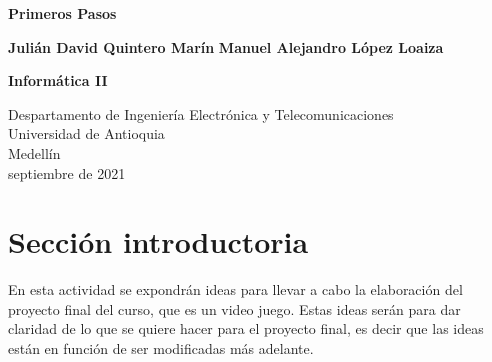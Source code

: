 \documentclass{article}
\begin{document}
\begin{titlepage}
    \begin{center}
        \vspace*{1cm}
            
        \Huge
        \textbf{Primeros Pasos}
            
        \vspace{0.5cm}
        \LARGE
        
            
        \vspace{1.5cm}
            
        \textbf{Julián David Quintero Marín}
		\textbf{Manuel Alejandro López Loaiza}
        \newline
        \newline
        \newline
        \newline

        
        
        \textbf{Informática II}
        
        \vfill
            
        \vspace{0.8cm}
  
        \Large
        Despartamento de Ingeniería Electrónica y Telecomunicaciones\\
        Universidad de Antioquia\\
        Medellín\\
        septiembre de 2021
            
    \end{center}
\end{titlepage}

\tableofcontents
\newpage
\section{Sección introductoria}\label{intro}
En esta actividad se expondrán ideas para llevar a cabo la elaboración del proyecto final del curso, que es un video juego. Estas ideas serán para dar claridad de lo que se quiere hacer para el proyecto final, es decir que las ideas están en función de ser modificadas más adelante.
\end{document}
